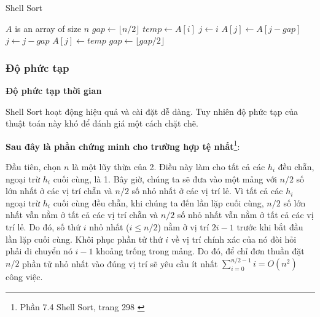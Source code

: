 \begin{algorithm}[H]
\caption{Shell Sort}
\label{alg:shell-sort}
\begin{algorithmic}

\Require $A$ is an array of size $n$
\State $gap \gets \lfloor n / 2 \rfloor$ 
 
     
        \State $temp \gets A[i]$ 
        \State $j \gets i$
         
            \State $A[j] \gets A[j-gap]$ 
            \State $j \gets j - gap$
        \EndWhile
        \State $A[j] \gets temp$ 
    \EndFor
    \State $gap \gets \lfloor gap / 2 \rfloor$ 
\EndWhile
\EndFunction

\end{algorithmic}
\end{algorithm}


\subsubsection{Độ phức tạp}

\textbf{Độ phức tạp thời gian} 

Shell Sort hoạt động hiệu quả và cài đặt dễ dàng. Tuy nhiên độ phức tạp của thuật toán này khó để đánh giá một cách chặt chẽ.

\textbf{Sau đây là phần chứng minh cho trường hợp tệ nhất}\footnote{Phần 7.4 Shell Sort, trang 298 \cite{dsa-analysis-cpp}}:

Đầu tiên, chọn $n$ là một lũy thừa của 2. Điều này làm cho tất cả các $h_i$ đều chẵn, ngoại trừ $h_i$ cuối cùng, là 1. Bây giờ, chúng ta sẽ đưa vào một mảng với $n/2$ số lớn nhất ở các vị trí chẵn và $n/2$ số nhỏ nhất ở các vị trí lẻ. Vì tất cả các $h_i$ ngoại trừ $h_i$ cuối cùng đều chẵn, khi chúng ta đến lần lặp cuối cùng, $n/2$ số lớn nhất vẫn nằm ở tất cả các vị trí chẵn và $n/2$ số nhỏ nhất vẫn nằm ở tất cả các vị trí lẻ. Do đó, số thứ $i$ nhỏ nhất ($i\leq n/2$) nằm ở vị trí $2i - 1$ trước khi bắt đầu lần lặp cuối cùng. Khôi phục phần tử thứ $i$ về vị trí chính xác của nó đòi hỏi phải di chuyển nó $i-1$ khoảng trống trong mảng. Do đó, để chỉ đơn thuần đặt $n/2$ phần tử nhỏ nhất vào đúng vị trí sẽ yêu cầu ít nhất $\sum_{i=0}^{n/2 - 1}i=O(n^{2})$ công việc.

